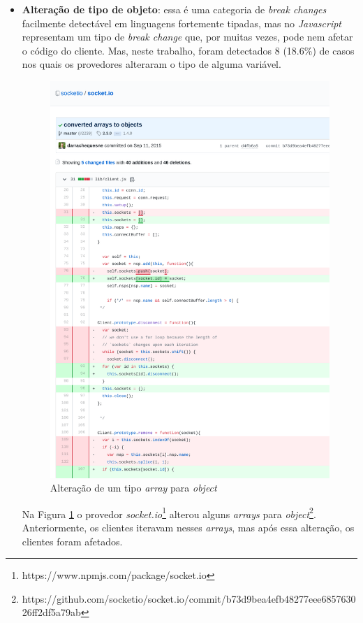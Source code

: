 \begin{itemize}
    \item \textbf{Alteração de tipo de objeto}: essa é uma categoria de \textit{break changes} facilmente detectável em linguagens fortemente tipadas, mas no \textit{Javascript} representam um tipo de \textit{break change} que, por muitas vezes, pode nem afetar o código do cliente. Mas, neste trabalho, foram detectados 8 (18.6\%) de casos nos quais os provedores alteraram o tipo de alguma variável.

    \begin{figure}
        \centering
        \includegraphics[scale=0.9]{figuras/bc_category_change_type.pdf}
        \caption{Alteração de um tipo \textit{array} para \textit{object}}
        \label{fig:bc_category_change_type}
    \end{figure}{}

    Na Figura \ref{fig:bc_category_change_type} o provedor \textit{socket.io}\footnote{https://www.npmjs.com/package/socket.io} alterou alguns \textit{arrays} para \textit{object}\footnote{https://github.com/socketio/socket.io/commit/b73d9bea4efb48277eee685763026ff2df5a79ab}. Anteriormente, os clientes iteravam nesses \textit{arrays}, mas após essa alteração, os clientes foram afetados.


\end{itemize}
